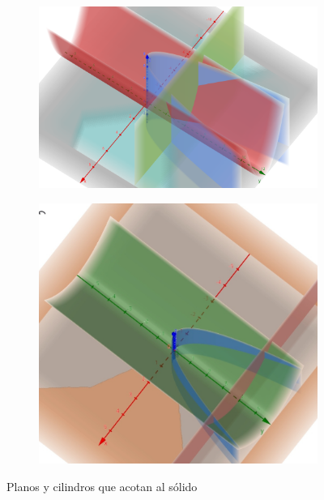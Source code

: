 \documentclass[12pt]{exam}
\begin{document}
\begin{questions}
\begin{enumerate}[a)]
  \begin{figure}[H]
    \centering
    \begin{subfigure}[b]{0.4\textwidth}
        \centering
        \includegraphics[width=\textwidth]{./img/i3e5.png}
        \label{fig:mapa1}
    \end{subfigure}
    \hfill
    \begin{subfigure}[b]{0.4\textwidth}
        \centering
        \includegraphics[width=\textwidth]{./img/i4e5.png}
        \label{fig:mapa2}
    \end{subfigure}
    \caption{Planos y cilindros que acotan al sólido}
      \end{figure}

\end{enumerate}
\end{questions}
\end{document}
